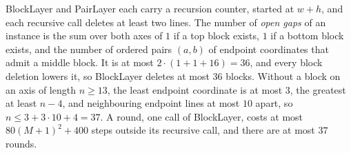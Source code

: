 \documentclass[11pt]{article}
\begin{document}
BlockLayer and PairLayer each carry a recursion counter, started at $w+h$, and each recursive call
deletes at least two lines. The number of \emph{open gaps} of an instance is the sum over both axes
of $1$ if a top block exists, $1$ if a bottom block exists, and the number of ordered pairs $(a,b)$
of endpoint coordinates that admit a middle block. It is at most $2\cdot(1+1+16)=36$, and every
block deletion lowers it, so BlockLayer deletes at most $36$ blocks. Without a block on an axis of
length $n\ge 13$, the least endpoint coordinate is at most $3$, the greatest at least $n-4$, and
neighbouring endpoint lines at most $10$ apart, so $n\le 3+3\cdot 10+4=37$. A round, one call of
BlockLayer, costs at most $80(M+1)^2+400$ steps outside its recursive call, and there are at most
$37$ rounds.
\end{document}
